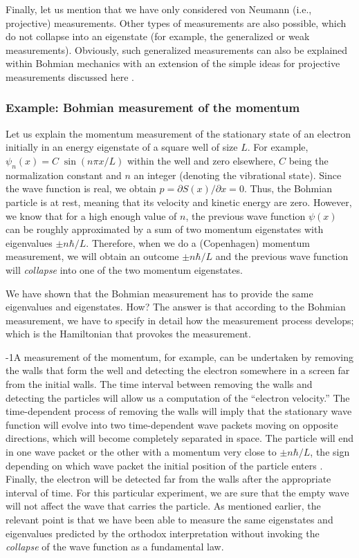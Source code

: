 \documentclass[nofootinbib, secnumarabic, amsmath, nobibnotes,10pt,aps,pra]{revtex4-1}
\begin{document}
Finally, let us mention that we have only considered von Neumann
(i.e., projective) measurements. Other types of measurements are
also possible, which do not collapse into an eigenstate (for example, the generalized or  weak measurements). Obviously, such generalized measurements can also be explained within Bohmian mechanics with an extension of the simple ideas for projective measurements discussed here
\cite{om.bomhhiley1993,om.Durrnaive,om.Durrllibre}.

\subsubsection{Example: Bohmian measurement of the momentum}
\label{om.measure_moment}

Let us explain the momentum measurement of the stationary state of
an electron initially in an energy eigenstate of a square well of
size $L$. For example, $\psi_n(x) = C \; \sin(n \pi x/L)$ within the
well and zero elsewhere, $C$ being the normalization constant and
$n$ an integer (denoting the vibrational state). Since the wave
function is real, we obtain $p = \partial S(x)/\partial x = 0$.
Thus, the Bohmian particle is at rest, meaning that its velocity and
kinetic energy are zero. However, we know that for a high enough
value of $n$, the previous wave function $\psi(x)$ can be roughly
approximated by a sum of two momentum eigenstates with eigenvalues
$\pm n \hbar/L$. Therefore, when we do a (Copenhagen) momentum
measurement, we will obtain an outcome $\pm n \hbar/L$ and the
previous wave function will \textit{collapse} into one of the two
momentum eigenstates.

We have shown that the Bohmian measurement has to provide the same
eigenvalues and eigenstates. How? The answer is that according to
the Bohmian measurement, we have to specify in detail how the
measurement process develops; which is the Hamiltonian that provokes the measurement.

\looseness-1A measurement of the momentum, for example, can be undertaken by
removing the walls that form the well and detecting the electron
somewhere in a screen far from the initial walls. The time interval
between removing the walls and detecting the particles will allow us
a computation of the ``electron velocity.'' The time-dependent
process of removing the walls will imply that the stationary wave
function will evolve into two time-dependent wave packets moving on
opposite directions, which will become completely separated in
space. The particle will end in one wave packet or the other with a
momentum very close to $\pm n \hbar/L$, the sign depending on which
wave packet the initial position of the particle enters
\cite{om.bohm1952b}. Finally, the electron will be detected far from
the walls after the appropriate interval of time. For this
particular experiment, we are sure that the empty wave will not
affect the wave that carries the particle. As mentioned earlier, the
relevant point is that we have been able to measure the same
eigenstates and eigenvalues predicted by the orthodox interpretation
without invoking the \textit{collapse} of the wave function as a fundamental law.
\end{document}
